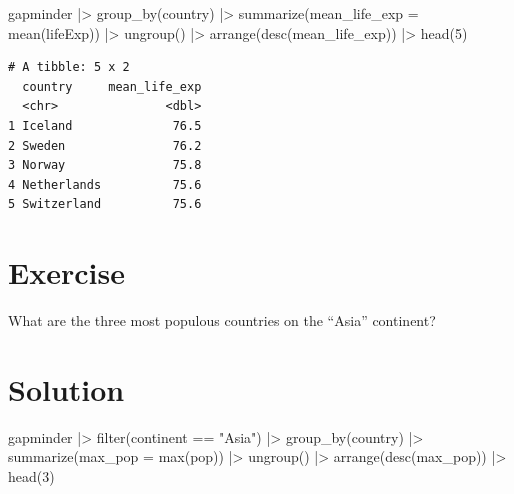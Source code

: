\documentclass[
  letterpaper,
  DIV=11,
  numbers=noendperiod]{scrreprt}
\newenvironment{Shaded}{\begin{snugshade}}{\end{snugshade}}
\newcommand{\AttributeTok}[1]{\textcolor[rgb]{0.40,0.45,0.13}{#1}}
\newcommand{\DecValTok}[1]{\textcolor[rgb]{0.68,0.00,0.00}{#1}}
\newcommand{\FunctionTok}[1]{\textcolor[rgb]{0.28,0.35,0.67}{#1}}
\newcommand{\NormalTok}[1]{\textcolor[rgb]{0.00,0.23,0.31}{#1}}
\newcommand{\SpecialCharTok}[1]{\textcolor[rgb]{0.37,0.37,0.37}{#1}}
\newcommand{\StringTok}[1]{\textcolor[rgb]{0.13,0.47,0.30}{#1}}
\begin{document}
\begin{Shaded}
\begin{Highlighting}[]
\NormalTok{gapminder }\SpecialCharTok{|\textgreater{}}
  \FunctionTok{group\_by}\NormalTok{(country) }\SpecialCharTok{|\textgreater{}}
  \FunctionTok{summarize}\NormalTok{(}\AttributeTok{mean\_life\_exp =} \FunctionTok{mean}\NormalTok{(lifeExp)) }\SpecialCharTok{|\textgreater{}}
  \FunctionTok{ungroup}\NormalTok{() }\SpecialCharTok{|\textgreater{}}
  \FunctionTok{arrange}\NormalTok{(}\FunctionTok{desc}\NormalTok{(mean\_life\_exp)) }\SpecialCharTok{|\textgreater{}} 
  \FunctionTok{head}\NormalTok{(}\DecValTok{5}\NormalTok{)}
\end{Highlighting}
\end{Shaded}

\begin{verbatim}
# A tibble: 5 x 2
  country     mean_life_exp
  <chr>               <dbl>
1 Iceland              76.5
2 Sweden               76.2
3 Norway               75.8
4 Netherlands          75.6
5 Switzerland          75.6
\end{verbatim}

\section{Exercise}

What are the three most populous countries on the ``Asia'' continent?

\section{Solution}

\begin{Shaded}
\begin{Highlighting}[]
\NormalTok{gapminder }\SpecialCharTok{|\textgreater{}}
  \FunctionTok{filter}\NormalTok{(continent }\SpecialCharTok{==} \StringTok{"Asia"}\NormalTok{) }\SpecialCharTok{|\textgreater{}}
  \FunctionTok{group\_by}\NormalTok{(country) }\SpecialCharTok{|\textgreater{}}
  \FunctionTok{summarize}\NormalTok{(}\AttributeTok{max\_pop =} \FunctionTok{max}\NormalTok{(pop)) }\SpecialCharTok{|\textgreater{}}
  \FunctionTok{ungroup}\NormalTok{() }\SpecialCharTok{|\textgreater{}}
  \FunctionTok{arrange}\NormalTok{(}\FunctionTok{desc}\NormalTok{(max\_pop)) }\SpecialCharTok{|\textgreater{}}
  \FunctionTok{head}\NormalTok{(}\DecValTok{3}\NormalTok{)}
\end{Highlighting}
\end{Shaded}
\end{document}

